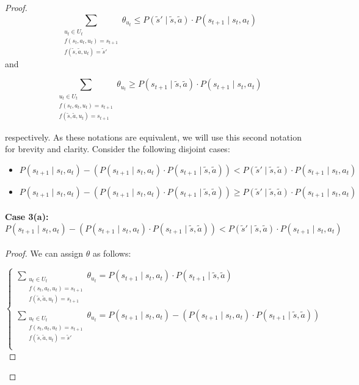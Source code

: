 \begin{proof}
\begin{equation}
\label{eq: overlapping constraint 3}
\sum_{\substack{u_t \in U_t \\f(s_t, a_t, u_t) = s_{t+1} \\ f(\tilde{s}, \tilde{a}, u_t) = \tilde{s}'}} \theta_{u_t} \leq P(\tilde{s}' \mid \tilde{s}, \tilde{a}) \cdot P(s_{t+1} \mid s_t, a_t)     
\end{equation}
and

\begin{equation}
\label{eq: overlapping constraint 4}
\sum_{\substack{u_t \in U_t \\f(s_t, a_t, u_t) = s_{t+1} \\ f(\tilde{s}, \tilde{a}, u_t) = s_{t+1}}} \theta_{u_t}\geq P(s_{t+1} \mid \tilde{s}, \tilde{a}) \cdot P(s_{t+1} \mid s_t, a_t)     
\end{equation}

respectively. As these notations are equivalent, we will use this second notation for brevity and clarity. Consider the following disjoint cases:
\begin{itemize}
    \item $P(s_{t+1} \mid s_t, a_t) - (P(s_{t+1} \mid s_t, a_t) \cdot P(s_{t+1} \mid \tilde{s}, \tilde{a})) < P(\tilde{s}' \mid \tilde{s}, \tilde{a}) \cdot P(s_{t+1} \mid s_t, a_t)$
    \item $P(s_{t+1} \mid s_t, a_t) - (P(s_{t+1} \mid s_t, a_t) \cdot P(s_{t+1} \mid \tilde{s}, \tilde{a})) \geq P(\tilde{s}' \mid \tilde{s}, \tilde{a}) \cdot P(s_{t+1} \mid s_t, a_t)$
\end{itemize}

\pagebreak
\paragraph{Case 3(a): $P(s_{t+1} \mid s_t, a_t) - (P(s_{t+1} \mid s_t, a_t) \cdot P(s_{t+1} \mid \tilde{s}, \tilde{a})) < P(\tilde{s}' \mid \tilde{s}, \tilde{a}) \cdot P(s_{t+1} \mid s_t, a_t)$}
\noindent
\begin{proof}
We can assign $\theta$ as follows:

\[
\begin{cases}
    \sum_{\substack{u_t \in U_t \\f(s_t, a_t, u_t) = s_{t+1} \\ f(\tilde{s}, \tilde{a}, u_t) = s_{t+1}}}{\theta_{u_t}} = P(s_{t+1} \mid s_t, a_t) \cdot P(s_{t+1} \mid \tilde{s}, \tilde{a})\\
    
    \sum_{\substack{u_t \in U_t \\f(s_t, a_t, u_t) = s_{t+1} \\ f(\tilde{s}, \tilde{a}, u_t) = \tilde{s}'}}{\theta_{u_t}} = P(s_{t+1} \mid s_t, a_t) - (P(s_{t+1} \mid s_t, a_t) \cdot P(s_{t+1} \mid \tilde{s}, \tilde{a})) \\
    

\end{cases}\]
\end{proof}
\end{proof}
